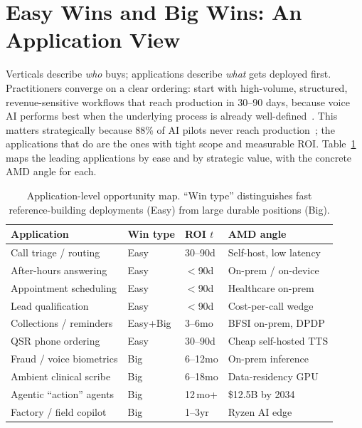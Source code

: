 \documentclass[blind]{gtac}
\begin{document}
\section{Easy Wins and Big Wins: An Application View}
\label{sec:wins}

Verticals describe \emph{who} buys; applications describe \emph{what} gets deployed first. Practitioners converge on a clear ordering: start with high-volume, structured, revenue-sensitive workflows that reach production in 30--90 days, because voice AI performs best when the underlying process is already well-defined~\cite{retell_roi,balto_usecases}. This matters strategically because 88\% of AI pilots never reach production~\cite{telnyx_europe}; the applications that do are the ones with tight scope and measurable ROI. Table~\ref{tab:wins} maps the leading applications by ease and by strategic value, with the concrete AMD angle for each.

\begin{table}[H]
\centering
\caption{Application-level opportunity map. ``Win type'' distinguishes fast reference-building deployments (Easy) from large durable positions (Big).}
\label{tab:wins}
\tiny
\begin{tabular}{@{}p{0.95in}p{0.42in}p{0.34in}p{0.82in}@{}}
\toprule
Application & Win type & ROI $t$ & AMD angle \\
\midrule
Call triage / routing & Easy & 30--90d & Self-host, low latency \\
After-hours answering & Easy & $<$90d & On-prem / on-device \\
Appointment scheduling & Easy & $<$90d & Healthcare on-prem \\
Lead qualification & Easy & $<$90d & Cost-per-call wedge \\
Collections / reminders & Easy+Big & 3--6mo & BFSI on-prem, DPDP \\
QSR phone ordering & Easy & 30--90d & Cheap self-hosted TTS \\
Fraud / voice biometrics & Big & 6--12mo & On-prem inference \\
Ambient clinical scribe & Big & 6--18mo & Data-residency GPU \\
Agentic ``action'' agents & Big & 12\,mo+ & \$12.5B by 2034 \\
Factory / field copilot & Big & 1--3yr & Ryzen AI edge \\
\bottomrule
\end{tabular}
\end{table}
\end{document}
